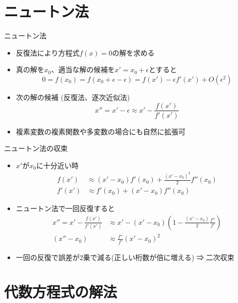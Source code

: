 \documentclass[dvipdfmx]{beamer}
\begin{document}
\section{ニュートン法}

\begin{frame}[t,fragile]{ニュートン法}
  \begin{itemize}
    \setlength{\itemsep}{1em}
  \item 反復法により方程式$f(x)=0$の解を求める
  \item 真の解を$x_0$、適当な解の候補を$x'=x_0+\epsilon$とすると
    \[
    0 = f(x_0) = f(x_0+\epsilon-\epsilon) = f(x') - \epsilon f'(x') + O(\epsilon^2)
    \]
  \item 次の解の候補 (反復法、逐次近似法)
    \[
    x'' = x'-\epsilon \approx x' - \frac{f(x')}{f'(x')}
    \]
  \item 複素変数の複素関数や多変数の場合にも自然に拡張可
  \end{itemize}
\end{frame}

\begin{frame}[t,fragile]{ニュートン法の収束}
  \begin{itemize}
    \setlength{\itemsep}{1em}
  \item $x'$が$x_0$に十分近い時
    \begin{align*}
      f(x') &\approx (x'-x_0) f'(x_0) + \frac{(x' - x_0)^2}{2} f''(x_0) \\
      f'(x') &\approx f'(x_0) + (x' - x_0) f''(x_0)
    \end{align*}
  \item ニュートン法で一回反復すると
    \begin{align*}
      x'' =  x' - \frac{f(x')}{f'(x')} &\approx x' - (x'-x_0)(1-\frac{(x'-x_0)}{2}\frac{f''}{f'}) \\
      (x''-x_0) &\approx \frac{f''}{f'} (x' - x_0)^2
    \end{align*}
    \item 一回の反復で誤差が2乗で減る(正しい桁数が倍に増える) ⇒ 二次収束
  \end{itemize}
\end{frame}

\section{代数方程式の解法}
\end{document}
